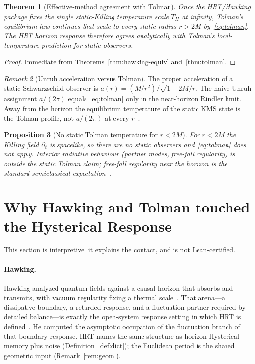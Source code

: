 \documentclass[11pt]{article}
\newtheorem{theorem}{Theorem}[section]
\newtheorem{proposition}[theorem]{Proposition}
\theoremstyle{definition}
\theoremstyle{remark}
\newtheorem{remark}[theorem]{Remark}
\begin{document}
\begin{theorem}[Effective-method agreement with Tolman]
\label{thm:tolman-equiv}
Once the HRT/Hawking package fixes the single static-Killing temperature scale $T_H$
at infinity, Tolman's equilibrium law continues that scale to every static radius
$r>2M$ by~\eqref{eq:tolman}.
The HRT horizon response therefore agrees analytically with Tolman's local-temperature
prediction for static observers.
\end{theorem}

\begin{proof}
Immediate from Theorems~\ref{thm:hawking-equiv} and~\ref{thm:tolman}.
\end{proof}

\begin{remark}[Unruh acceleration versus Tolman]
\label{rem:unruh}
The proper acceleration of a static Schwarzschild observer is
$a(r)=(M/r^2)/\sqrt{1-2M/r}$.
The naive Unruh assignment $a/(2\pi)$ equals~\eqref{eq:tolman} only in the near-horizon
Rindler limit.
Away from the horizon the equilibrium temperature of the static KMS state is the Tolman
profile, not $a/(2\pi)$ at every $r$~\cite{Unruh1976,Tolman1930}.
\end{remark}

\begin{proposition}[No static Tolman temperature for $r<2M$]
\label{prop:interior}
For $r<2M$ the Killing field $\partial_t$ is spacelike, so there are no static observers
and~\eqref{eq:tolman} does not apply.
Interior radiative behaviour (partner modes, free-fall regularity) is outside the
static Tolman claim; free-fall regularity near the horizon is the standard semiclassical
expectation~\cite{Unruh1976}.
\end{proposition}

\section{Why Hawking and Tolman touched the Hysterical Response}
\label{sec:interpret}
This section is interpretive: it explains the contact, and is not Lean-certified.

\paragraph{Hawking.}
Hawking analyzed quantum fields against a causal horizon that absorbs and transmits,
with vacuum regularity fixing a thermal scale~\cite{Hawking1975}.
That arena---a dissipative boundary, a retarded response, and a fluctuation partner
required by detailed balance---is exactly the open-system response setting in which
HRT is defined~\cite{boyd2026response,HuRavalSinha2002}.
He computed the asymptotic occupation of the fluctuation branch of that boundary
response.
HRT names the same structure as horizon Hysterical memory plus noise
(Definition~\ref{def:dict}); the Euclidean period is the shared geometric input
(Remark~\ref{rem:geom}).
\end{document}
